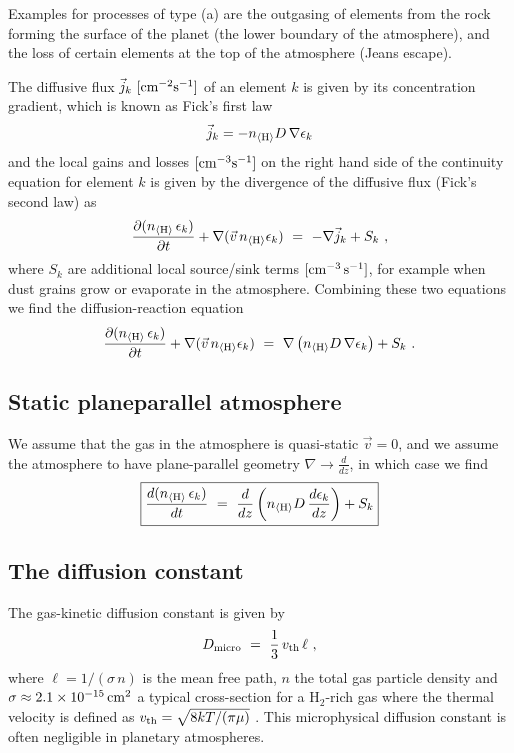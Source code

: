 \documentclass[11pt]{article}
\def\nH{n_{\langle\rm H\rangle}}
\def\ek{\epsilon_k}
\def\pdiff#1#2{\frac{\partial #1}{\partial #2}}
\begin{document}
Examples for processes of type (a) are the outgasing of elements from
the rock forming the surface of the planet (the lower boundary of the
atmosphere), and the loss of certain elements at the top of the
atmosphere (Jeans escape).

The diffusive flux $\vec{j}_k\rm\ [cm^{-2} s^{-1}]$ of an element $k$ is
given by its concentration gradient, which is known as Fick's first law 
\citep[see e.g.][]{Bringuier2013} 
\begin{equation}
  \vec{j}_k = -\nH D\,\nabla\ek
\end{equation}
and the local gains and losses  $\rm [cm^{-3} s^{-1}]$ on the right
hand side of the continuity equation for element $k$ is given by the
divergence of the diffusive flux (Fick's second law) as
\begin{equation}
  \pdiff{(\nH\,\ek)}{t} + \nabla(\vec{v}\,\nH\ek) 
   ~=~ -\nabla\vec{j}_k + S_k \ ,
\end{equation}
where $S_k$ are additional local source/sink terms
$\rm[cm^{-3}\,s^{-1}]$, for example when dust grains grow or evaporate
in the atmosphere. Combining these two equations we find the
diffusion-reaction equation
\begin{equation}
  \pdiff{(\nH\,\ek)}{t} + \nabla(\vec{v}\,\nH\ek) 
   ~=~ \nabla\left(\nH D\,\nabla\ek\right) + S_k \ .
\end{equation}

\subsection{Static planeparallel atmosphere}

We assume that the gas in the atmosphere is quasi-static $\vec{v}=0$, and
we assume the atmosphere to have plane-parallel geometry
$\nabla\to\frac{d}{dz}$, in which case we find
\begin{equation}
  \boxed{\frac{d(\nH\,\ek)}{dt} ~=~ 
     \frac{d}{dz}\left(\nH D\,\frac{d\ek}{dz}\right)  + S_k}
  \label{basic}
\end{equation}

\subsection{The diffusion constant}

The gas-kinetic diffusion constant is given by
\begin{equation}
  D_{\rm micro} ~=~ \frac{1}{3}\,v_{\rm th}\,\ell \ ,
\end{equation}
where $\ell=1/(\sigma\,n)$ is the mean free path, $n$ the total
gas particle density and $\sigma\approx 2.1\times 10^{-15}\rm\,cm^2$
a typical cross-section for a H$_2$-rich gas where the thermal
velocity is defined as $v_{\rm th}=\sqrt{8 k T/(\pi\mu)}$
\citep{Woitke2003}.  This microphysical diffusion constant is often 
negligible in planetary atmospheres. 
\end{document}
